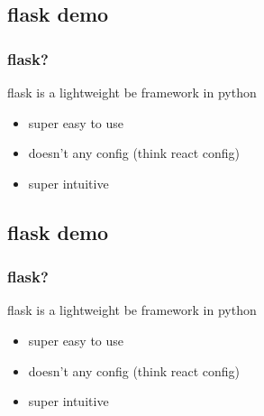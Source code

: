 \documentclass{beamer}
\begin{document}


\subsection{flask demo}
\begin{frame}
\frametitle{flask?}
\begin{block}{\textbf{}}
  flask is a lightweight be framework in python
  \begin{itemize}
    \item super easy to use
    \item doesn't any config (think react config)
    \item super intuitive
  \end{itemize}

\end{block}
\end{frame}



\subsection{flask demo}
\begin{frame}
\frametitle{flask?}
\begin{block}{\textbf{}}
  flask is a lightweight be framework in python
  \begin{itemize}
    \item super easy to use
    \item doesn't any config (think react config)
    \item super intuitive
  \end{itemize}

\end{block}
\end{frame}


\end{document}
